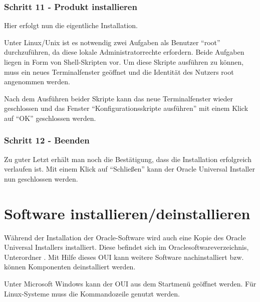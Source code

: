         \subsubsection{Schritt 11 - Produkt installieren}
          Hier erfolgt nun die eigentliche Installation.

          Unter Linux/Unix ist es notwendig zwei Aufgaben als Benutzer \enquote{root} durchzuführen, da diese lokale Administratorrechte erfordern. Beide Aufgaben liegen in Form von Shell-Skripten vor. Um diese Skripte ausführen zu können, muss ein neues Terminalfenster geöffnet und die Identität des Nutzers root angenommen werden.

          Nach dem Ausführen beider Skripte kann das neue Terminalfenster wieder geschlossen und das Fenster \enquote{Konfigurationsskripte ausführen} mit einem Klick auf \enquote{OK} geschlossen werden.


		  
\clearpage		  
        \subsubsection{Schritt 12 - Beenden}
          Zu guter Letzt erhält man noch die Bestätigung, dass die Installation erfolgreich verlaufen ist. Mit einem Klick auf \enquote{Schließen} kann der Oracle Universal Installer nun geschlossen werden.
    \section{Software installieren/deinstallieren}
      Während der Installation der Oracle-Software wird auch eine Kopie des Oracle Universal Installers installiert. Diese befindet sich im Oraclesoftwareverzeichnis, Unterordner . Mit Hilfe dieses OUI kann weitere Software nachinstalliert bzw. können Komponenten deinstalliert werden.

      Unter Microsoft Windows kann der OUI aus dem Startmenü geöffnet werden. Für Linux-Systeme muss die Kommandozeile genutzt werden.


